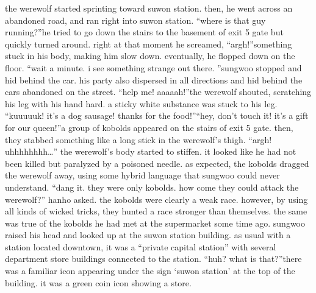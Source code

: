 the werewolf started sprinting toward suwon station.
 then, he went across an abandoned road, and ran right into suwon station.
“where is that guy running?”he tried to go down the stairs to the basement of exit 5 gate but quickly turned around.
right at that moment he screamed, “argh!”something stuck in his body, making him slow down.
eventually, he flopped down on the floor.
“wait a minute.
 i see something strange out there.
”sungwoo stopped and hid behind the car.
 his party also dispersed in all directions and hid behind the cars abandoned on the street.
“help me! aaaaah!”the werewolf shouted, scratching his leg with his hand hard.
 a sticky white substance was stuck to his leg.
“kuuuuuk! it’s a dog sausage! thanks for the food!”“hey, don’t touch it! it’s a gift for our queen!”a group of kobolds appeared on the stairs of exit 5 gate.
 then, they stabbed something like a long stick in the werewolf’s thigh.
“argh! uhhhhhhhh…” the werewolf’s body started to stiffen.
 it looked like he had not been killed but paralyzed by a poisoned needle.
as expected, the kobolds dragged the werewolf away, using some hybrid language that sungwoo could never understand.
“dang it.
 they were only kobolds.
 how come they could attack the werewolf?” hanho asked.
the kobolds were clearly a weak race.
 however, by using all kinds of wicked tricks, they hunted a race stronger than themselves.
 the same was true of the kobolds he had met at the supermarket some time ago.
sungwoo raised his head and looked up at the suwon station building.
 as usual with a station located downtown, it was a “private capital station” with several department store buildings connected to the station.
“huh? what is that?”there was a familiar icon appearing under the sign ‘suwon station’ at the top of the building.
 it was a green coin icon showing a store.


